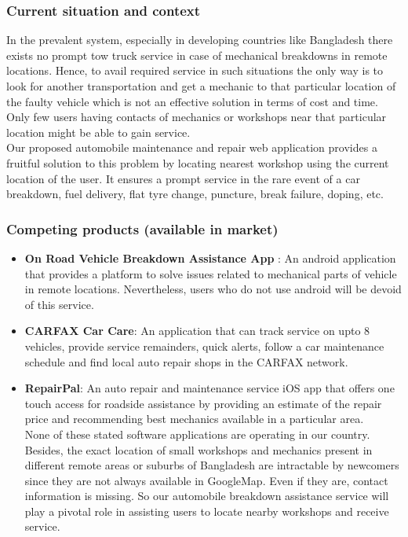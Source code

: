 \documentclass[11pt]{article} %
\begin{document}
		\subsubsection{Current situation and context }
		In the prevalent system, especially in developing countries like Bangladesh there exists no prompt tow truck service in case of mechanical breakdowns in remote locations. Hence, to avail required service in such situations the only way is to look for another transportation and get a mechanic to that particular location of the faulty vehicle which is not an effective solution in terms of cost and time. Only few users having contacts of mechanics or workshops near that particular location might be able to gain service.\\
		Our proposed automobile maintenance and repair web application provides a fruitful solution to this problem by locating nearest workshop using the current location of the user. It ensures a prompt service in the rare event of a car breakdown, fuel delivery, flat tyre change, puncture, break failure, doping, etc.
		\subsubsection{Competing products (available in market) }
		\begin{itemize}
	    \item \textbf{On Road Vehicle Breakdown Assistance App
	    }: An android application that provides a platform to solve issues related to mechanical parts of vehicle in remote locations\cite{onroad-assistance}. Nevertheless, users who do not use android will be devoid of this service.
		\item \textbf{CARFAX Car Care}: An application that can track service on upto 8 vehicles, provide service remainders, quick alerts, follow a car maintenance schedule and find local auto repair shops in the CARFAX network\cite{carfax}.
		\item \textbf{RepairPal}: An auto repair and maintenance service iOS app that offers one touch access for roadside assistance by providing an estimate of the repair price and recommending best mechanics available in a particular area\cite{reapirpal}.\\
		None of these stated software applications are operating in our country. Besides, the exact location of small workshops and mechanics present in different remote areas or suburbs of Bangladesh are intractable by newcomers since they are not always available in GoogleMap. Even if they are, contact information is missing. So our automobile breakdown assistance service will play a pivotal role in assisting users to locate nearby workshops and receive service.
	    \end{itemize}
\end{document}
